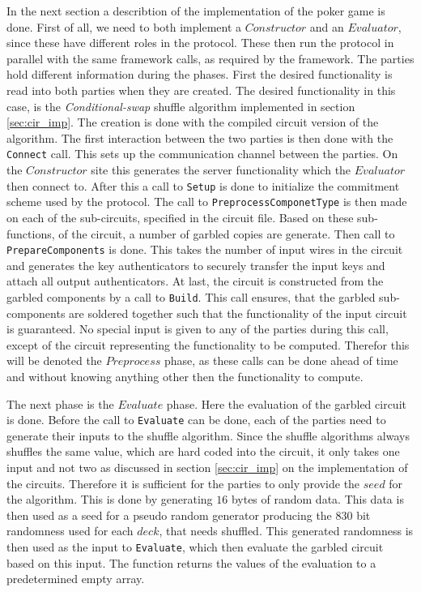\documentclass[twoside,11pt,openright]{report}
\newcommand{\CS}{\textit{Conditional-swap} }
\begin{document}
In the next section a describtion of the implementation of the poker game is done. First of all, we need to both implement a $Constructor$ and an $Evaluator$, since these have different roles in the protocol. These then run the protocol in parallel with the same framework calls, as required by the framework. The parties hold different information during the phases. First the desired functionality is read into both parties when they are created. The desired functionality in this case, is the \CS shuffle algorithm implemented in section \ref{sec:cir_imp}. The creation is done with the compiled circuit version of the algorithm. The first interaction between the two parties is then done with the \verb|Connect| call. This sets up the communication channel between the parties. On the $Constructor$ site this generates the server functionality which the $Evaluator$ then connect to. After this a call to \verb|Setup| is done to initialize the commitment scheme used by the protocol. The call to \verb|PreprocessComponetType| is then made on each of the sub-circuits, specified in the circuit file. Based on these sub-functions, of the circuit, a number of garbled copies are generate. Then call to \verb|PrepareComponents| is done. This takes the number of input wires in the circuit and generates the key authenticators to securely transfer the input keys and attach all output authenticators. At last, the circuit is constructed from the garbled components by a call to \verb|Build|. This call ensures, that the garbled sub-components are soldered together such that the functionality of the input circuit is guaranteed. No special input is given to any of the parties during this call, except of the circuit representing the functionality to be computed. Therefor this will be denoted the $Preprocess$ phase, as these calls can be done ahead of time and without knowing anything other then the functionality to compute.

The next phase is the $Evaluate$ phase. Here the evaluation of the garbled circuit is done. Before the call to \verb|Evaluate| can be done, each of the parties need to generate their inputs to the shuffle algorithm. Since the shuffle algorithms always shuffles the same value, which are hard coded into the circuit, it only takes one input and not two as discussed in section \ref{sec:cir_imp} on the implementation of the circuits. Therefore it is sufficient for the parties to only provide the $seed$ for the algorithm. This is done by generating $16$ bytes of random data. This data is then used as a seed for a pseudo random generator producing the $830$ bit randomness used for each $deck$, that needs shuffled. This generated randomness is then used as the input to \verb|Evaluate|, which then evaluate the garbled circuit based on this input. The function returns the values of the evaluation to a predetermined empty array.
\end{document}
